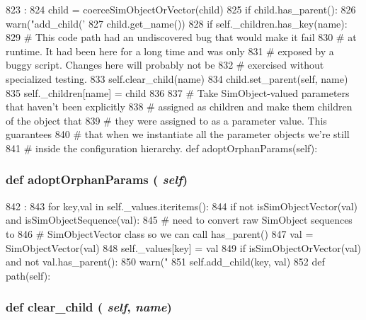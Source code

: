 \begin{DoxyCode}
823                                     :
824         child = coerceSimObjectOrVector(child)
825         if child.has_parent():
826             warn("add_child('%
827                 child.get_name())
828         if self._children.has_key(name):
829             # This code path had an undiscovered bug that would make it fail
830             # at runtime. It had been here for a long time and was only
831             # exposed by a buggy script. Changes here will probably not be
832             # exercised without specialized testing.
833             self.clear_child(name)
834         child.set_parent(self, name)
835         self._children[name] = child
836 
837     # Take SimObject-valued parameters that haven't been explicitly
838     # assigned as children and make them children of the object that
839     # they were assigned to as a parameter value.  This guarantees
840     # that when we instantiate all the parameter objects we're still
841     # inside the configuration hierarchy.
    def adoptOrphanParams(self):
\end{DoxyCode}
\hypertarget{classm5_1_1SimObject_1_1SimObject_a0b974da794b43621c358251cabf87f92}{
\subsubsection[{adoptOrphanParams}]{\setlength{\rightskip}{0pt plus 5cm}def adoptOrphanParams ( {\em self})}}
\label{classm5_1_1SimObject_1_1SimObject_a0b974da794b43621c358251cabf87f92}



\begin{DoxyCode}
842                                :
843         for key,val in self._values.iteritems():
844             if not isSimObjectVector(val) and isSimObjectSequence(val):
845                 # need to convert raw SimObject sequences to
846                 # SimObjectVector class so we can call has_parent()
847                 val = SimObjectVector(val)
848                 self._values[key] = val
849             if isSimObjectOrVector(val) and not val.has_parent():
850                 warn("%
851                 self.add_child(key, val)
852 
    def path(self):
\end{DoxyCode}
\hypertarget{classm5_1_1SimObject_1_1SimObject_ab18a2b99a1199dc94ba38cbc13e0c1b9}{
\subsubsection[{clear\_\-child}]{\setlength{\rightskip}{0pt plus 5cm}def clear\_\-child ( {\em self}, \/   {\em name})}}
\label{classm5_1_1SimObject_1_1SimObject_ab18a2b99a1199dc94ba38cbc13e0c1b9}




